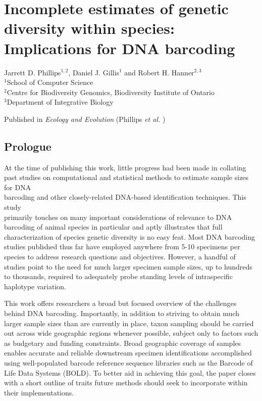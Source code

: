 \chapter{Incomplete estimates of genetic diversity within species: Implications for DNA barcoding}
\linespread{1.0}

\noindent Jarrett D. Phillips$^{1, 2}$, Daniel J. Gillis$^1$ and Robert H. Hanner$^{2, 3}$ \\ $^1$School of Computer Science \\ $^2$Centre for Biodiversity Genomics, Biodiversity Institute of Ontario \\ $^3$Department of Integrative Biology

\vspace{\fill}

\noindent Published in \textit{Ecology and Evolution} (Phillips \textit{et al.} \cite{phillips2019incomplete})


\section{Prologue}

At the time of publishing this work, little progress had been made in collating past studies on computational and statistical methods to estimate sample sizes for DNA \\ barcoding and other closely-related DNA-based identification techniques. This study \\ primarily touches on many important considerations of relevance to DNA barcoding of animal species in particular and aptly illustrates that full characterization of species genetic diversity is no easy feat. Most DNA barcoding studies published thus far have employed anywhere from 5-10 specimens per species to address research questions and objectives. However, a handful of studies point to the need for much larger specimen sample sizes, up to hundreds to thousands, required to adequately probe standing levels of intraspecific haplotype variation.

\vspace{5mm} 

This work offers researchers a broad but focused overview of the challenges behind DNA barcoding. Importantly, in addition to striving to obtain much larger sample sizes than are currently in place, taxon sampling should be carried out across wide geographic regions whenever possible, subject only to factors such as budgetary and funding constraints. Broad geographic coverage of samples enables accurate and reliable downstream specimen identifications accomplished using well-populated barcode reference sequence libraries such as the Barcode of Life Data Systems (BOLD). To better aid in achieving this goal, the paper closes with a short outline of traits future methods should seek to incorporate within their implementations.

